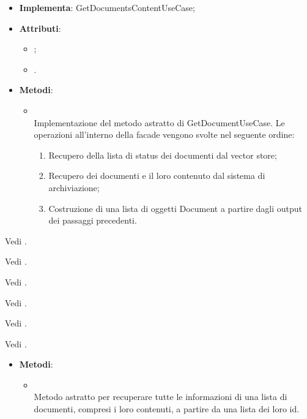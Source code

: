 \documentclass[10pt, a4paper]{article}
\begin{document}
\label{GetDocumentsContentFacadeServiceDettaglio}
\begin{itemize}
    \item \textbf{Implementa}: GetDocumentsContentUseCase;
    \item \textbf{Attributi}:
    \begin{itemize}
        \item {};
        \item {}.
    \end{itemize}
    \item \textbf{Metodi}:
    \begin{itemize}
        \item {}\\
        Implementazione del metodo astratto di GetDocumentUseCase. Le operazioni all'interno della facade vengono svolte nel seguente ordine:
        \begin{enumerate}
            \item Recupero della lista di status dei documenti dal vector store;
            \item Recupero dei documenti e il loro contenuto dal sistema di archiviazione;
            \item Costruzione di una lista di oggetti Document a partire dagli output dei passaggi precedenti.
        \end{enumerate}
    \end{itemize}
\end{itemize}

Vedi .

Vedi .

Vedi .


Vedi .



Vedi .


Vedi .


\label{GetDocumentsContentUseCaseDettaglio}
\begin{itemize}
    \item \textbf{Metodi}:
    \begin{itemize}
        \item {}\\
        Metodo astratto per recuperare tutte le informazioni di una lista di documenti, compresi i loro contenuti, a partire da una lista dei loro id.
    \end{itemize}
\end{itemize}
\end{document}
